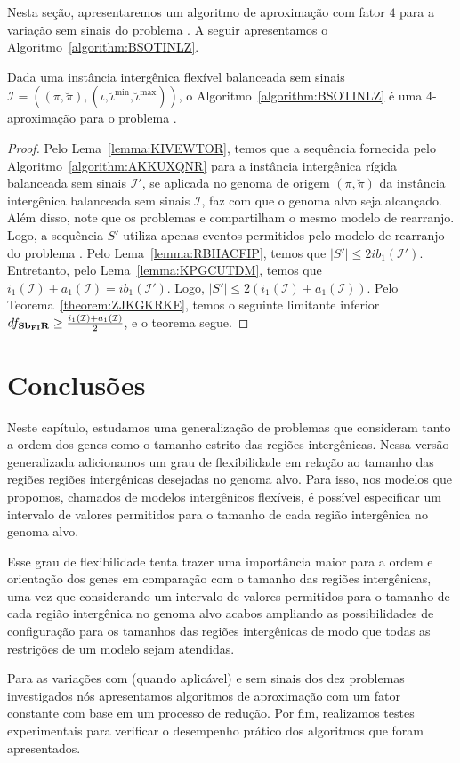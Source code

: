 Nesta seção, apresentaremos um algoritmo de aproximação com fator $4$ para a variação sem sinais do problema \SbFIR{}. A seguir apresentamos o Algoritmo~\ref{algorithm:BSOTINLZ}.



\begin{theorem}\label{theorem:WKATVVBS}
Dada uma instância intergênica flexível balanceada sem sinais $\mathcal{I} = ((\pi,\breve\pi),(\iota,\breve\iota^{\min},\breve\iota^{\max}))$, o Algoritmo~\ref{algorithm:BSOTINLZ} é uma $4$-aproximação para o problema \SbFIR{}.
\end{theorem}
\begin{proof}
Pelo Lema~\ref{lemma:KIVEWTOR}, temos que a sequência fornecida pelo Algoritmo~\ref{algorithm:AKKUXQNR} para a instância intergênica rígida balanceada sem sinais $\mathcal{I'}$, se aplicada no genoma de origem $(\pi,\breve\pi)$ da instância intergênica balanceada sem sinais $\mathcal{I}$, faz com que o genoma alvo seja alcançado. Além disso, note que os problemas \SbIR{} e \SbFIR{} compartilham o mesmo modelo de rearranjo. Logo, a sequência $S'$ utiliza apenas eventos permitidos pelo modelo de rearranjo do problema \SbFIR{}. Pelo Lema~\ref{lemma:RBHACFIP}, temos que $|S'| \le 2ib_1(\mathcal{I'})$. Entretanto, pelo Lema~\ref{lemma:KPGCUTDM}, temos que $i_1(\mathcal{I}) + a_1(\mathcal{I}) = ib_1(\mathcal{I'})$. Logo, $|S'| \le 2(i_1(\mathcal{I}) + a_1(\mathcal{I}))$. Pelo Teorema~\ref{theorem:ZJKGKRKE}, temos o seguinte limitante inferior $df_{\textbf{Sb\textsubscript{FI}R}} \ge \frac{i_1(\mathcal{I}) + a_1(\mathcal{I})}{2}$, e o teorema segue.
\end{proof}


\section{Conclusões}

Neste capítulo, estudamos uma generalização de problemas que consideram tanto a ordem dos genes como o tamanho estrito das regiões intergênicas. Nessa versão generalizada adicionamos um grau de flexibilidade em relação ao tamanho das regiões regiões intergênicas desejadas no genoma alvo. Para isso, nos modelos que propomos, chamados de modelos intergênicos flexíveis, é possível especificar um intervalo de valores permitidos para o tamanho de cada região intergênica no genoma alvo. 

Esse grau de flexibilidade tenta trazer uma importância maior para a ordem e orientação dos genes em comparação com o tamanho das regiões intergênicas, uma vez que considerando um intervalo de valores permitidos para o tamanho de cada região intergênica no genoma alvo acabos ampliando as possibilidades de configuração para os tamanhos das regiões intergênicas de modo que todas as restrições de um modelo sejam atendidas.

Para as variações com (quando aplicável) e sem sinais dos dez problemas investigados nós apresentamos algoritmos de aproximação com um fator constante com base em um processo de redução. Por fim, realizamos testes experimentais para verificar o desempenho prático dos algoritmos que foram apresentados.